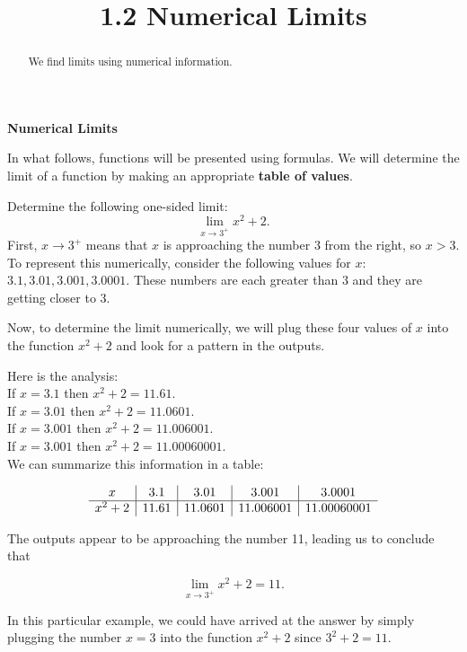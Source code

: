 \documentclass{ximera}
\title{1.2 Numerical Limits}
\begin{document}
\begin{abstract}
We find limits using numerical information.
\end{abstract}

\maketitle

\begin{center}
\bf{Numerical Limits}
\end{center}


In what follows, functions will be presented using formulas.  
We will determine the limit of a function by making an appropriate \textbf{table of values}.
 


\begin{example}[example 1]
Determine the following one-sided limit: 
\[\lim_{x \to 3^{+}} x^2 + 2.\]
First,  $x \to 3^{+}$ means that $x$ is approaching the number $3$ from the right, so $x > 3$. 
To represent this numerically, consider the following values for $x$: $3.1, 3.01, 3.001, 3.0001$.
These numbers are each greater than 3 and they are getting closer to 3.
 
Now, to determine the limit numerically,  we will plug these four values of $x$ into the function $x^2 + 2$ and  
look for a pattern in the outputs.

Here is the analysis:\\
If $x = 3.1$ then $x^2 + 2 = 11.61$.\\
If $x = 3.01$ then $x^2 + 2 = 11.0601$.\\
If $x = 3.001$ then $x^2 + 2 = 11.006001$.\\
If $x = 3.001$ then $x^2 + 2 = 11.00060001$.\\

We can summarize this information in a table:
  
\[
\begin{array}{ c | c | c | c | c }
  x & 3.1 & 3.01 & 3.001 & 3.0001 \\ 
	\hline
	x^2 + 2 & 11.61 & 11.0601 & 11.006001 & 11.00060001
\end{array}
\]


The outputs appear to be approaching the number 11, leading us to conclude that

\[\lim_{x \to 3^+} x^2 + 2 = 11.\] 
 
In this particular example, we could have arrived at the answer by simply plugging the number $x = 3$
into the function $x^2 + 2$ since $3^2 + 2 = 11$.  
\end{example}
\end{document}

